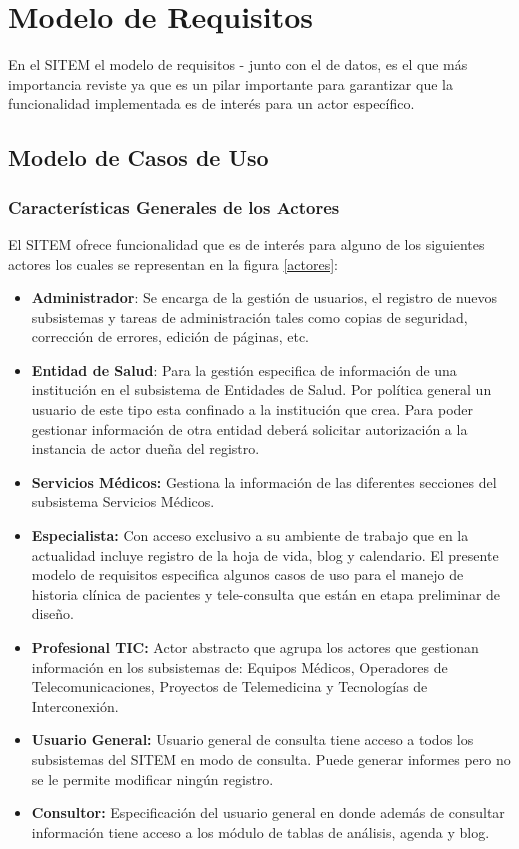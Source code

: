 \chapter{Modelo de Requisitos}
\label{modelo_requisitos}

En el SITEM el modelo de requisitos - junto con el de datos, es el que más importancia reviste ya que es un pilar importante para garantizar que la funcionalidad implementada es de interés para un actor específico.

\section{Modelo de Casos de Uso}
\subsection{Características Generales de los Actores}

El SITEM ofrece funcionalidad que es de interés para alguno de los siguientes actores los cuales se representan en la figura \ref{actores}:

\begin{itemize}
\item \textbf{Administrador}: Se encarga de la gestión de usuarios, el registro de nuevos subsistemas y tareas de administración tales como copias de seguridad, corrección de errores, edición de páginas, etc.
\item \textbf{Entidad de Salud}: Para la gestión especifica de información de una institución en el subsistema de Entidades de Salud. Por política general un usuario de este tipo esta confinado a la institución que crea. Para poder gestionar información de otra entidad deberá solicitar autorización a la instancia de actor dueña del registro.
\item \textbf{Servicios Médicos:} Gestiona la información de las diferentes secciones del subsistema Servicios Médicos.
\item \textbf{Especialista:} Con acceso exclusivo a su ambiente de trabajo que en la actualidad incluye registro de la hoja de vida, blog y calendario. El presente modelo de requisitos especifica algunos casos de uso para el manejo de historia clínica de pacientes y tele-consulta que están en etapa preliminar de diseño.
\item \textbf{Profesional TIC:} Actor abstracto que agrupa los actores que gestionan información en los subsistemas de: Equipos Médicos, Operadores de Telecomunicaciones, Proyectos de Telemedicina y Tecnologías de Interconexión.
\item \textbf{Usuario General:} Usuario general de consulta tiene acceso a todos los subsistemas del SITEM en modo de consulta. Puede generar informes pero no se le permite modificar ningún registro.
\item \textbf{Consultor:} Especificación del usuario general en donde además de consultar información tiene acceso a los módulo de tablas de análisis, agenda y blog.
\end{itemize}

